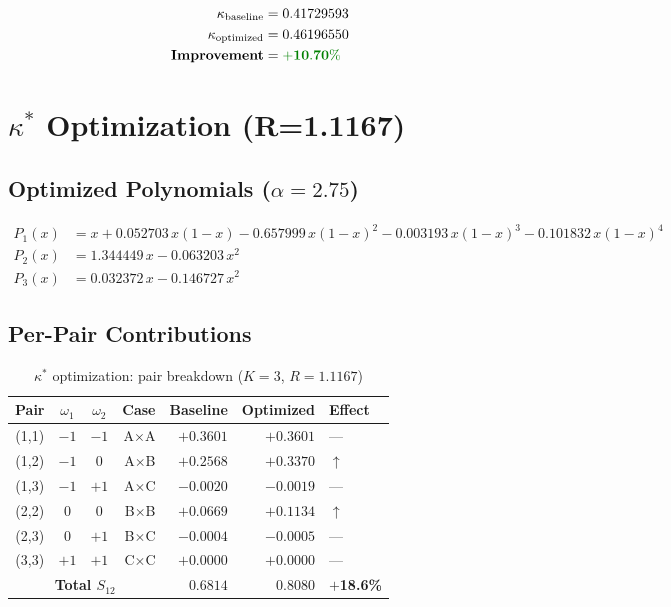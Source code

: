 \documentclass[11pt]{article}
\begin{document}
\begin{align*}
\kappa_{\text{baseline}} &= 0.41729593 \\
\kappa_{\text{optimized}} &= 0.46196550 \\
\textbf{Improvement} &= \textcolor{improvement}{\mathbf{+10.70\%}}
\end{align*}

\section{$\kappa^*$ Optimization (R=1.1167)}

\subsection{Optimized Polynomials ($\alpha=2.75$)}

\begin{align*}
P_1(x) &= x + 0.052703\, x(1-x) -0.657999\, x(1-x)^2 -0.003193\, x(1-x)^3 -0.101832\, x(1-x)^4 \\[1ex]
P_2(x) &= 1.344449\, x -0.063203\, x^2 \\[1ex]
P_3(x) &= 0.032372\, x -0.146727\, x^2
\end{align*}

\subsection{Per-Pair Contributions}

\begin{table}[h]
\centering
\caption{$\kappa^*$ optimization: pair breakdown ($K=3$, $R=1.1167$)}
\begin{tabular}{cccrrrl}
\toprule
Pair & $\omega_1$ & $\omega_2$ & Case & Baseline & Optimized & Effect \\
\midrule
(1,1) & $-1$ & $-1$ & A$\times$A & $+0.3601$ & $+0.3601$ & --- \\
(1,2) & $-1$ & $0$ & A$\times$B & $+0.2568$ & $+0.3370$ & $\uparrow$ \\
(1,3) & $-1$ & $+1$ & A$\times$C & $-0.0020$ & $-0.0019$ & --- \\
(2,2) & $0$ & $0$ & B$\times$B & $+0.0669$ & $+0.1134$ & $\uparrow$ \\
(2,3) & $0$ & $+1$ & B$\times$C & $-0.0004$ & $-0.0005$ & --- \\
(3,3) & $+1$ & $+1$ & C$\times$C & $+0.0000$ & $+0.0000$ & --- \\
\midrule
\multicolumn{4}{c}{\textbf{Total $S_{12}$}} & $0.6814$ & $0.8080$ & \textbf{$+$18.6\%} \\
\bottomrule
\end{tabular}
\end{table}
\end{document}
